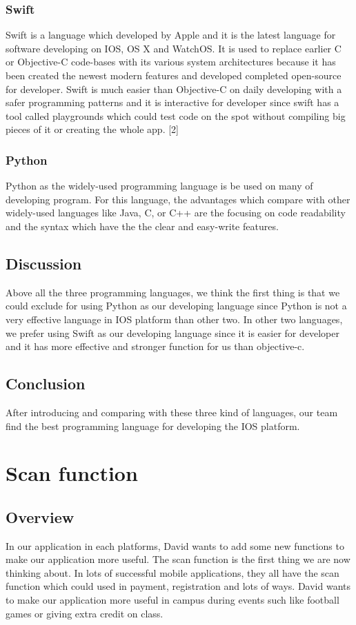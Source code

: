 \documentclass[letterpaper, 10pt,titlepage]{article}
\begin{document}
\subsubsection{Swift}
Swift is a language which developed by Apple and it is the latest language for software developing on IOS, OS X and WatchOS. It is used to replace earlier C or Objective-C code-bases with its various system architectures because it has been created the newest modern features and developed completed open-source for developer. Swift is much easier than Objective-C on daily developing with a safer programming patterns and it is interactive for developer since swift has a tool called playgrounds which could test code on the spot without compiling big pieces of it or creating the whole app. [2]

\subsubsection{Python}
Python as the widely-used programming language is be used on many of developing program. For this language, the advantages which compare with other widely-used languages like Java, C, or C++ are the focusing on code readability and the syntax which have the the clear and easy-write features. 

\subsection{Discussion}
Above all the three programming languages, we think the first thing is that we could exclude for using Python as our developing language since Python is not a very effective language in IOS platform than other two. In other two languages, we prefer using Swift as our developing language since it is easier for developer and it has more effective and stronger function for us than objective-c.

\subsection{Conclusion}
After introducing and comparing with these three kind of languages, our team find the best programming language for developing the IOS platform.


\section{Scan function}

\subsection{Overview}
In our application in each platforms, David wants to add some new functions to make our application more useful. The scan function is the first thing we are now thinking about. In lots of successful mobile applications, they all have the scan function which could used in payment, registration and lots of ways. David wants to make our application more useful in campus during events such like football games or giving extra credit on class.
\end{document}

